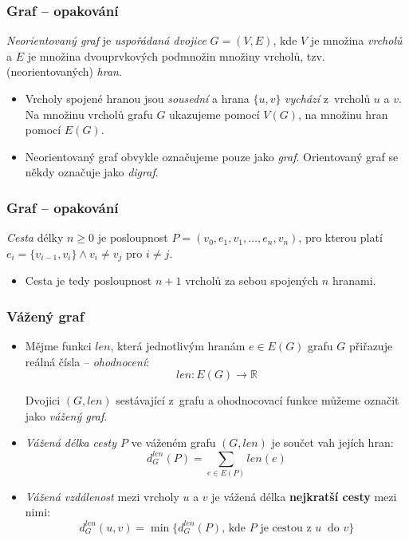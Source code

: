 \documentclass[10pt,xcolor=pdflatex,hyperref={unicode,hidelinks}]{beamer}
\begin{document}
\begin{frame}\frametitle{Graf -- opakování}
    \begin{definition}
        \emph{Neorientovaný graf} je \emph{uspořádaná dvojice} $G = (V, E)$, kde $V$ je množina \emph{vrcholů} a $E$ je množina dvouprvkových podmnožin množiny vrcholů, tzv. (neorientovaných) \emph{hran}.
    \end{definition}
    
    \begin{itemize}
        \item<2-> Vrcholy spojené hranou jsou \emph{sousední} a hrana $\{u, v\}$ \emph{vychází} z~vrcholů $u$ a $v$.
    Na množinu vrcholů grafu $G$ ukazujeme pomocí $V(G)$, na množinu hran pomocí $E(G)$.
        \item<2-> Neorientovaný graf obvykle označujeme pouze jako \emph{graf}. Orientovaný graf se někdy označuje jako \emph{digraf}.
    \end{itemize}
\end{frame}

\begin{frame}\frametitle{Graf -- opakování}
    \begin{definition}
        \emph{Cesta} délky $n \geq 0$ je posloupnost $P = (v_0, e_1, v_1,\ldots, e_n, v_n)$, pro kterou platí $e_i = \{ v_{i-1}, v_i \} \wedge v_i\ne v_j \text{ pro } i \ne j$.
    \end{definition}
    
    \begin{itemize}
        \item<2-> Cesta je tedy posloupnost $n + 1$ vrcholů za sebou spojených $n$ hranami.
    \end{itemize}
\end{frame}

\begin{frame}\frametitle{Vážený graf}
    \begin{itemize}
        \item<1-> {Mějme funkci $len$, která jednotlivým hranám $e \in E(G)$ grafu $G$ přiřazuje reálná čísla -- \emph{ohodnocení}:
        \[
            len: E(G) \rightarrow \mathbb{R}
        \]
        
        Dvojici $(G, len)$ sestávající z~grafu a ohodnocovací funkce můžeme označit jako \emph{vážený graf}.}
        \item<2-> {\emph{Vážená délka cesty $P$} ve váženém grafu $(G, len)$ je součet vah jejích hran: 
        \[
            d^{len}_G(P) = \sum_{e \in E(P)} len(e)
        \]}
        \item<2-> {\emph{Vážená vzdálenost} mezi vrcholy $u$ a $v$ je vážená délka \textbf{nejkratší cesty} mezi nimi:
        \[
            d^{len}_G(u, v) = \min\{d^{len}_G(P) \text{, kde } P \text{ je cestou z~} u~\text{ do } v\}
        \]}
    \end{itemize}
\end{frame}
\end{document}
